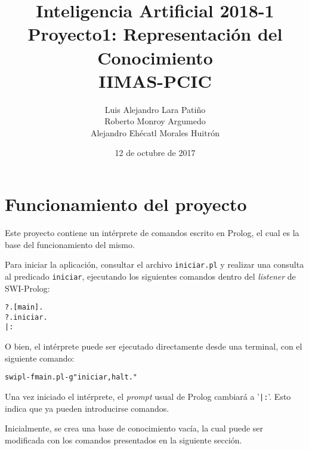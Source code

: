 \documentclass[11pt]{article}
\title{Inteligencia Artificial 2018-1 \\ Proyecto1: Representación del Conocimiento\\
\small{IIMAS-PCIC}}
\author{Luis Alejandro Lara Patiño\\Roberto Monroy Argumedo\\
Alejandro Ehécatl Morales Huitrón}
\date{12 de octubre de 2017}
\newcommand{\bt}{\begin{alltt}}
\newcommand{\et}{\end{alltt}}
\begin{document}
\maketitle

\section{Funcionamiento del proyecto}

Este proyecto contiene un intérprete de comandos escrito en Prolog, el cual es la base del funcionamiento del mismo.

Para iniciar la aplicación, consultar el archivo \texttt{iniciar.pl} y realizar una consulta al predicado \texttt{iniciar}, ejecutando los siguientes comandos dentro del \textit{listener} de SWI-Prolog:

\bt
    ?. [main].
    ?. iniciar.
    |:
\et

O bien, el intérprete puede ser ejecutado directamente desde una terminal, con el siguiente comando:

\bt
    swipl -f main.pl -g "iniciar, halt."
\et

Una vez iniciado el intérprete, el \textit{prompt} usual de Prolog cambiará a '\texttt{|:}'. Esto indica que ya pueden introducirse comandos.

Inicialmente, se crea una base de conocimiento vacía, la cual puede ser modificada con los comandos presentados en la siguiente sección.
\end{document}
